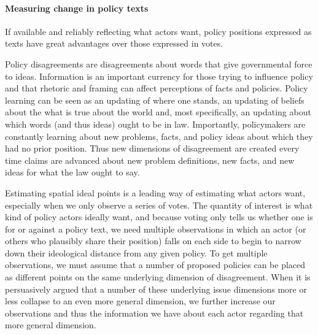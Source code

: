 
\paragraph{Measuring change in policy texts}

If available and reliably reflecting what actors want, policy positions expressed as texts have great advantages over those expressed in votes.

Policy disagreements are disagreements about words that give governmental force to ideas. Information is an important currency for those trying to influence policy and that rhetoric and framing can affect perceptions of facts and policies. Policy learning can be seen as an updating of where one stands, an updating of beliefs about the what is true about the world and, most specifically, an updating about which words (and thus ideas) ought to be in law. Importantly, policymakers are constantly learning about new problems, facts, and policy ideas about which they had no prior position. Thus new dimensions of disagreement are created every time claims are advanced about new problem definitions, new facts, and new ideas for what the law ought to say.

Estimating spatial ideal points is a leading way of estimating what actors want, especially when we only observe a series of votes. The quantity of interest is what kind of policy actors ideally want, and because voting only tells us whether one is for or against a policy text, we need multiple observations in which an actor (or others who plausibly share their position) falls on each side to begin to narrow down their ideological distance from any given policy. To get multiple observations, we must assume that a number of proposed policies can be placed as different points on the same underlying dimension of disagreement. When it is persuasively argued that a number of these underlying issue dimensions more or less collapse to an even more general dimension, we further increase our observations and thus the information we have about each actor regarding that more general dimension. 

